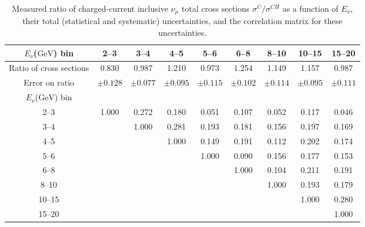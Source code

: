 \documentclass[aps,preprint,showpacs,superscriptaddress]{revtex4} %
\newcommand{\numu}{\ensuremath{\nu_{\mu}}\xspace}
\newcommand{\GeV}{\ensuremath{\mbox{GeV}}\xspace}
\newcommand{\Enu}{\ensuremath{E_{\nu}}\xspace}
\begin{document}
\begingroup
\squeezetable
\begin{table}
  \begin{tabular}{c|cccccccc}
    \hline \hline
    \Enu (\GeV) bin & 2--3 & 3--4 & 4--5 & 5--6 & 6--8 & 8--10 & 10--15 & 15--20 \\ 
    \hline
    Ratio of cross sections & 0.830 & 0.987 & 1.210 & 0.973 & 1.254 & 1.149 & 1.157 & 0.987 \\ 
    Error on ratio & $ \pm 0.128 $ & $ \pm 0.077 $ & $ \pm 0.095 $ & $ \pm 0.115 $ & $ \pm 0.102 $ & $ \pm 0.114 $ & $ \pm 0.095 $ & $ \pm 0.111 $ \\ 
    \hline
    \Enu (\GeV) bin &  &  &  &  &  &  &  &  \\ 
    2--3 & 1.000 & 0.272 & 0.180 & 0.051 & 0.107 & 0.052 & 0.117 & 0.046 \\ 
    3--4 &  & 1.000 & 0.281 & 0.193 & 0.181 & 0.156 & 0.197 & 0.169 \\ 
    4--5 &  &  & 1.000 & 0.149 & 0.191 & 0.112 & 0.202 & 0.174 \\ 
    5--6 &  &  &  & 1.000 & 0.090 & 0.156 & 0.177 & 0.153 \\ 
    6--8 &  &  &  &  & 1.000 & 0.104 & 0.211 & 0.191 \\ 
    8--10 &  &  &  &  &  & 1.000 & 0.193 & 0.179 \\ 
    10--15 &  &  &  &  &  &  & 1.000 & 0.280 \\ 
    15--20 &  &  &  &  &  &  &  & 1.000 \\ 
    \hline \hline
  \end{tabular}
  \caption{Measured ratio of charged-current inclusive \numu total cross sections $\sigma^{C}/\sigma^{CH}$ as a function of \Enu, their total (statistical and systematic) uncertainties, and the correlation matrix for these uncertainties.}
  \label{tab:Enu_ratio_06_91_results_table}
\end{table}
\endgroup
\end{document}
